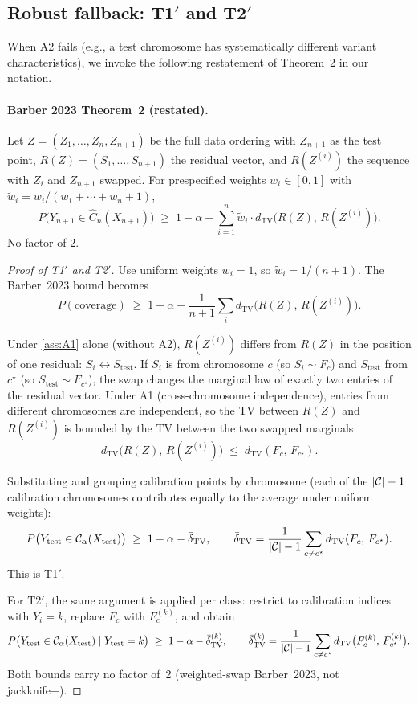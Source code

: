 \subsection{Robust fallback: T1$'$ and T2$'$}
\label{app:proofs:t1prime_t2prime}

When A2 fails (e.g., a test chromosome has systematically different variant characteristics), we invoke the following restatement of \citet{barber2023exchangeability} Theorem~2 in our notation.

\paragraph{Barber 2023 Theorem~2 (restated).}
Let $Z = (Z_1, \ldots, Z_n, Z_{n+1})$ be the full data ordering with $Z_{n+1}$ as the test point, $R(Z) = (S_1, \ldots, S_{n+1})$ the residual vector, and $R(Z^{(i)})$ the sequence with $Z_i$ and $Z_{n+1}$ swapped. For prespecified weights $w_i \in [0, 1]$ with $\tilde w_i = w_i / (w_1 + \cdots + w_n + 1)$,
\[
P\bigl(Y_{n+1} \in \hat C_n(X_{n+1})\bigr) \;\geq\; 1 - \alpha - \sum_{i=1}^n \tilde w_i \cdot d_{\mathrm{TV}}\bigl(R(Z),\, R(Z^{(i)})\bigr).
\]
No factor of 2.

\begin{proof}[Proof of T1$'$ and T2$'$]
Use uniform weights $w_i = 1$, so $\tilde w_i = 1/(n + 1)$. The Barber~2023 bound becomes
\[
P(\text{coverage}) \;\geq\; 1 - \alpha - \frac{1}{n+1} \sum_i d_{\mathrm{TV}}\bigl(R(Z),\, R(Z^{(i)})\bigr).
\]

Under \ref{ass:A1} alone (without A2), $R(Z^{(i)})$ differs from $R(Z)$ in the position of one residual: $S_i \leftrightarrow S_{\mathrm{test}}$. If $S_i$ is from chromosome $c$ (so $S_i \sim F_c$) and $S_{\mathrm{test}}$ from $c^\star$ (so $S_{\mathrm{test}} \sim F_{c^\star}$), the swap changes the marginal law of exactly two entries of the residual vector. Under A1 (cross-chromosome independence), entries from different chromosomes are independent, so the TV between $R(Z)$ and $R(Z^{(i)})$ is bounded by the TV between the two swapped marginals:
\[
d_{\mathrm{TV}}\bigl(R(Z),\, R(Z^{(i)})\bigr) \;\leq\; d_{\mathrm{TV}}(F_c,\, F_{c^\star}).
\]

Substituting and grouping calibration points by chromosome (each of the $|\mathcal{C}| - 1$ calibration chromosomes contributes equally to the average under uniform weights):
\[
P\bigl(Y_{\mathrm{test}} \in \mathcal{C}_\alpha(X_{\mathrm{test}})\bigr) \;\geq\; 1 - \alpha - \bar\delta_{\mathrm{TV}},
\qquad
\bar\delta_{\mathrm{TV}} = \frac{1}{|\mathcal{C}| - 1} \sum_{c \neq c^\star} d_{\mathrm{TV}}(F_c,\, F_{c^\star}).
\]
This is T1$'$.

For T2$'$, the same argument is applied per class: restrict to calibration indices with $Y_i = k$, replace $F_c$ with $F_c^{(k)}$, and obtain
\[
P\bigl(Y_{\mathrm{test}} \in \mathcal{C}_\alpha(X_{\mathrm{test}}) \mid Y_{\mathrm{test}} = k\bigr) \;\geq\; 1 - \alpha - \bar\delta_{\mathrm{TV}}^{(k)},
\qquad
\bar\delta_{\mathrm{TV}}^{(k)} = \frac{1}{|\mathcal{C}| - 1} \sum_{c \neq c^\star} d_{\mathrm{TV}}\bigl(F_c^{(k)},\, F_{c^\star}^{(k)}\bigr).
\]
Both bounds carry no factor of~2 (weighted-swap Barber~2023, not jackknife+).
\end{proof}

